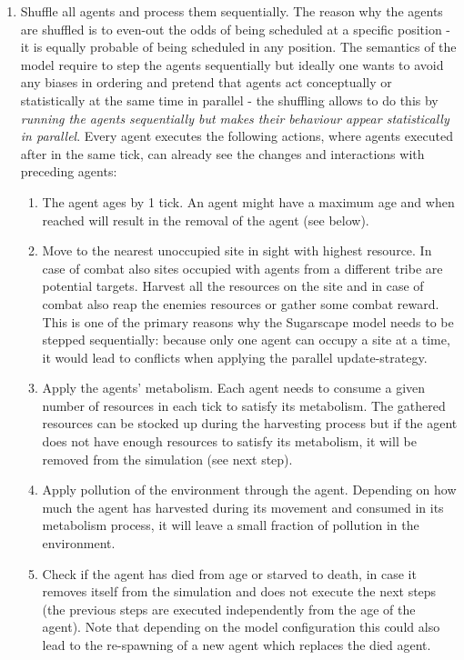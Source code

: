 \begin{enumerate}
	\item Shuffle all agents and process them sequentially. The reason why the agents are shuffled is to even-out the odds of being scheduled at a specific position - it is equally probable of being scheduled in any position. The semantics of the model require to step the agents sequentially but ideally one wants to avoid any biases in ordering and pretend that agents act conceptually or statistically at the same time in parallel - the shuffling allows to do this by \textit{running the agents sequentially but makes their behaviour appear statistically in parallel}. Every agent executes the following actions, where agents executed after in the same tick, can already see the changes and interactions with preceding agents:
	
	\begin{enumerate}
		\item The agent ages by 1 tick. An agent might have a maximum age and when reached will result in the removal of the agent (see below).
	
		\item Move to the nearest unoccupied site in sight with highest resource. In case of combat also sites occupied with agents from a different tribe are potential targets. Harvest all the resources on the site and in case of combat also reap the enemies resources or gather some combat reward. This is one of the primary reasons why the Sugarscape model needs to be stepped sequentially: because only one agent can occupy a site at a time, it would lead to conflicts when applying the parallel update-strategy.

		\item Apply the agents' metabolism. Each agent needs to consume a given number of resources in each tick to satisfy its metabolism. The gathered resources can be stocked up during the harvesting process but if the agent does not have enough resources to satisfy its metabolism, it will be removed from the simulation (see next step).
		
		\item Apply pollution of the environment through the agent. Depending on how much the agent has harvested during its movement and consumed in its metabolism process, it will leave a small fraction of pollution in the environment.
		
		\item Check if the agent has died from age or starved to death, in case it removes itself from the simulation and does not execute the next steps (the previous steps are executed independently from the age of the agent). Note that depending on the model configuration this could also lead to the re-spawning of a new agent which replaces the died agent.
		

\end{enumerate}
\end{enumerate}
